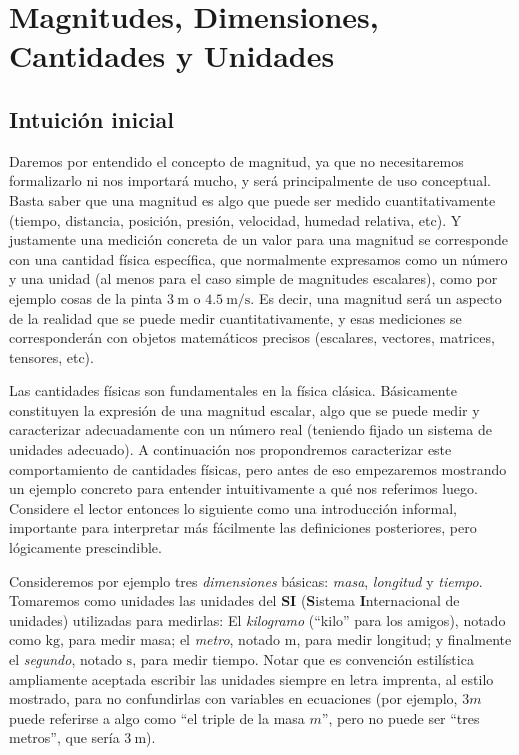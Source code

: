 \documentclass{article}
\begin{document}
\pagebreak

\section{Magnitudes, Dimensiones, Cantidades y Unidades}

\subsection{Intuición inicial}

Daremos por entendido el concepto de magnitud, ya que no necesitaremos formalizarlo ni nos importará mucho, y será principalmente de uso
conceptual. Basta saber
que una magnitud es algo que puede ser medido cuantitativamente (tiempo, distancia, posición, presión, velocidad, humedad relativa, etc).
Y justamente una medición concreta de un valor para una magnitud se corresponde con una cantidad física específica, que
normalmente expresamos como un número y una unidad (al menos para el caso simple de magnitudes escalares), como por ejemplo
cosas de la pinta $\SI{3}{\meter}$ o $\SI{4,5}{\meter \per \second}$. Es decir, una magnitud será un aspecto de la realidad que se
puede medir cuantitativamente, y esas mediciones se corresponderán con objetos matemáticos precisos (escalares, vectores, matrices,
tensores, etc).

Las cantidades físicas son fundamentales en la física clásica. Básicamente constituyen la expresión de una magnitud escalar,
algo que se puede medir y caracterizar adecuadamente con un número real (teniendo fijado un sistema de unidades adecuado).
A continuación nos propondremos caracterizar este comportamiento de cantidades físicas, pero antes de eso empezaremos mostrando
un ejemplo concreto para entender intuitivamente a qué nos referimos luego. Considere el lector entonces lo siguiente como
una introducción informal, importante para interpretar más fácilmente las definiciones posteriores, pero lógicamente prescindible.

Consideremos por ejemplo tres \textit{dimensiones} básicas: \textit{masa}, \textit{longitud} y \textit{tiempo}. Tomaremos como unidades
las unidades del \textbf{SI} (\textbf{S}istema \textbf{I}nternacional de unidades) utilizadas para medirlas: El \textit{kilogramo} (``kilo'' para los amigos), notado como $\si{\kilogram}$,
para medir masa; el \textit{metro}, notado $\si{\meter}$, para medir longitud; y finalmente el \textit{segundo}, notado $\si{\second}$, para medir tiempo. Notar
que es convención estilística ampliamente aceptada escribir las unidades siempre en letra imprenta, al estilo mostrado, para no confundirlas con variables en ecuaciones
(por ejemplo, $3m$ puede referirse a algo como ``el triple de la masa $m$'', pero no puede ser ``tres metros'', que sería $\SI{3}{\meter}$).
\end{document}
